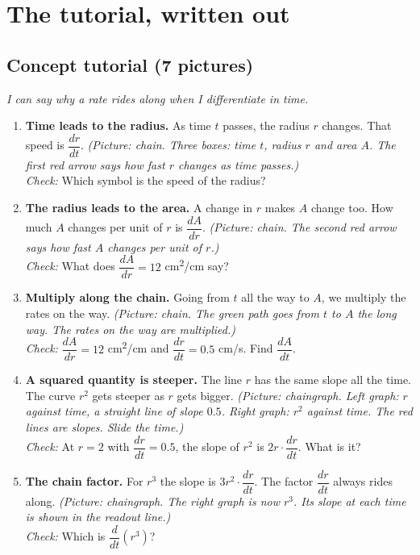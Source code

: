 \documentclass[11pt]{article}
\begin{document}
\section*{The tutorial, written out}
\subsection*{Concept tutorial (7 pictures)}
\textit{I can say why a rate rides along when I differentiate in time.}\par
\begin{enumerate}
\item \textbf{Time leads to the radius.} As time $t$ passes, the radius $r$ changes. That speed is $\dfrac{dr}{dt}$. \textit{(Picture: chain. Three boxes: time $t$, radius $r$ and area $A$. The first red arrow says how fast $r$ changes as time passes.)}\\ \textit{Check:} Which symbol is the speed of the radius? 
\item \textbf{The radius leads to the area.} A change in $r$ makes $A$ change too. How much $A$ changes per unit of $r$ is $\dfrac{dA}{dr}$. \textit{(Picture: chain. The second red arrow says how fast $A$ changes per unit of $r$.)}\\ \textit{Check:} What does $\dfrac{dA}{dr}=12$ cm\textsuperscript{2}/cm say? 
\item \textbf{Multiply along the chain.} Going from $t$ all the way to $A$, we multiply the rates on the way. \textit{(Picture: chain. The green path goes from $t$ to $A$ the long way. The rates on the way are multiplied.)}\\ \textit{Check:} $\dfrac{dA}{dr}=12$ cm\textsuperscript{2}/cm and $\dfrac{dr}{dt}=0.5$ cm/s. Find $\dfrac{dA}{dt}$. 
\item \textbf{A squared quantity is steeper.} The line $r$ has the same slope all the time. The curve $r^2$ gets steeper as $r$ gets bigger. \textit{(Picture: chaingraph. Left graph: $r$ against time, a straight line of slope $0.5$. Right graph: $r^2$ against time. The red lines are slopes. Slide the time.)}\\ \textit{Check:} At $r=2$ with $\dfrac{dr}{dt}=0.5$, the slope of $r^2$ is $2r\cdot\dfrac{dr}{dt}$. What is it? 
\item \textbf{The chain factor.} For $r^3$ the slope is $3r^2\cdot\dfrac{dr}{dt}$. The factor $\dfrac{dr}{dt}$ always rides along. \textit{(Picture: chaingraph. The right graph is now $r^3$. Its slope at each time is shown in the readout line.)}\\ \textit{Check:} Which is $\dfrac{d}{dt}(r^3)$? 

\end{enumerate}
\end{document}
